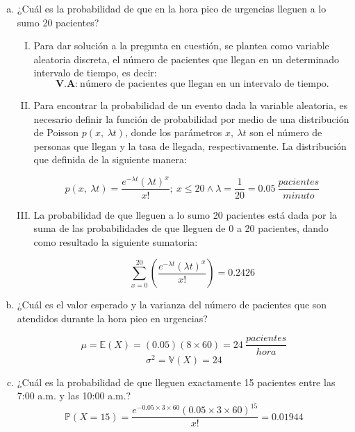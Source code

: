 \documentclass[11pt, spanish]{article}
\begin{document}
\begin{enumerate}[(a)]

\item ¿Cuál es la probabilidad de que en la hora pico de urgencias lleguen a lo sumo 20
pacientes?\\

\begin{enumerate}[(I)]

\item Para dar solución a la pregunta en cuestión, se plantea como variable aleatoria
discreta, el número de pacientes que llegan en un determinado intervalo de
tiempo, es decir:
$$\textbf{V.A:} \ \mbox{número de pacientes que llegan en un intervalo de tiempo}. $$

\item Para encontrar la probabilidad de un evento dada la variable aleatoria, es
necesario definir la función de probabilidad por medio de una distribución de
Poisson $p(x,\ \lambda t)$, donde los parámetros $x,\ \lambda t$ son el número de personas que llegan y la tasa de llegada, respectivamente. La distribución que definida de la
siguiente manera:

$$p(x,\ \lambda t) = \frac{e^{-\lambda t}(\lambda t)^x}{x!};\ x \leq 20 \wedge \lambda = \frac{1}{20} = 0.05\ \frac{pacientes}{minuto}$$

\item La probabilidad de que lleguen a lo sumo 20 pacientes está dada por la suma
de las probabilidades de que lleguen de 0 a 20 pacientes, dando como resultado la
siguiente sumatoria:

$$\sum_{x = 0}^{20} \left( \frac{e^{-\lambda t}(\lambda t)^{x}}{x!} \right) = 0.2426$$

\end{enumerate}

\item ¿Cuál es el valor esperado y la varianza del número de pacientes que son
atendidos durante la hora pico en urgencias?

$$\mu = \mathbb{E}(X) = (0.05)(8 \times 60) = 24 \ \frac{pacientes}{hora}$$
$$\sigma ^2 = \mathbb{V}(X) = 24$$

\item ¿Cuál es la probabilidad de que lleguen exactamente 15 pacientes entre las 7:00
a.m. y las 10:00 a.m.?\\

$$\mathbb{P}(X = 15) =  \frac{e^{-0.05 \times 3 \times 60}(0.05 \times 3 \times 60)^{15}}{x!} = 0.01944$$


\end{enumerate}
\end{document}
